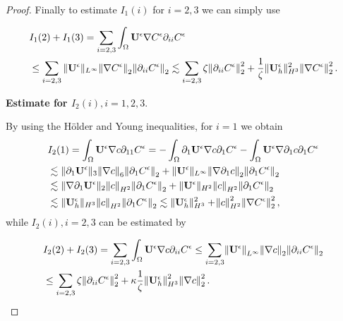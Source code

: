\documentclass[12pt]{report}
\numberwithin{theorem}{chapter}
\numberwithin{corollary}{chapter}
\numberwithin{lemma}{chapter}
\numberwithin{remark}{chapter}
\numberwithin{definition}{chapter}
\numberwithin{prop}{chapter}
\begin{document}
\begin{proof}
Finally to estimate $I_1(i)$ for $i = 2,3$ we can simply use

\begin{equation}
  \begin{split}
    & I_1(2) + I_1(3) = \sum_{i = 2,3} \int_\Omega \mathbf{U}^\epsilon \nabla C^\epsilon \partial_{ii} C^\epsilon \\
    & \leq \sum_{i = 2,3} \| \mathbf{U}^\epsilon \| _{L^\infty} \norm{\nabla C^\epsilon}_2 \norm{\partial_{ii}C^\epsilon}_2 \lesssim \sum_{i = 2,3} \zeta \norm{\partial_{ii} C^\epsilon}_2^2 + \frac{1}{\zeta} \| \mathbf{U}_h^\epsilon \| _ {H^3} ^ 2 \norm{\nabla C^\epsilon}_2^2. \raisetag{50pt}
  \end{split}
\end{equation}

\bigskip

\textbf{Estimate for $I_2(i), i=1,2,3.$}

By using the H\"older and Young inequalities, for $i = 1$ we obtain
%
\begin{equation} \label{cH2normappears}
  \begin{split}
    & I_2(1) = \int_\Omega \mathbf{U}^\epsilon \nabla c \partial_{11} C^\epsilon = -\int_\Omega \partial_1 \mathbf{U}^\epsilon \nabla c \partial_1 C^\epsilon - \int_\Omega \mathbf{U}^\epsilon \nabla \partial_1 c \partial_1 C^\epsilon \\
    & \lesssim \| \partial_1 \mathbf{U}^\epsilon \|_3 \norm{\nabla c}_6 \norm{\partial_1 C^\epsilon}_2 + \| \mathbf{U}^\epsilon \|_{L^\infty} \norm{\nabla \partial_1 c}_2 \norm{\partial_1 C^\epsilon}_2 \\
    & \lesssim \| \nabla \partial_1 \mathbf{U}^\epsilon \|_2 \norm{c}_{H^2} \norm{\partial_1 C^\epsilon}_2 + \| \mathbf{U}^\epsilon \|_{H^2} \norm{c}_{H^2} \norm{\partial_1 C^\epsilon}_2 \\
    & \lesssim \|  \mathbf{U}_h^\epsilon \|_{H^3} \norm{c}_{H^2} \norm{\partial_1 C^\epsilon}_2 \lesssim \|  \mathbf{U}_h^\epsilon \|_{H^3}^2 + \norm{c}_{H^2}^2 \norm{\nabla C^\epsilon}_2^2,
  \end{split}
\end{equation}
%
while $I_2(i), i = 2,3$ can be estimated by

\begin{equation}
  \begin{split}
  & I_2(2) + I_2(3) = \sum_{i=2,3} \int_\Omega \mathbf{U}^\epsilon \nabla c \partial_{ii} C^\epsilon \leq \sum_{i=2,3} \norm{\mathbf{U}^\epsilon}_{L^\infty} \norm{\nabla c}_2 \norm{\partial_{ii} C^\epsilon}_2 \\
  & \leq \sum_{i=2,3} \zeta \norm{\partial_{ii} C^\epsilon}_2^2 + \kappa \frac{1}{\zeta} \norm{\mathbf{U}_h^\epsilon}_{H^3}^2 \norm{\nabla c}_2^2.
  \end{split}
\end{equation}


\end{proof}
\end{document}
